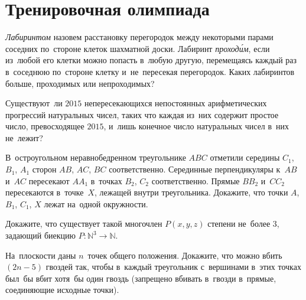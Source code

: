 
\section*{Тренировочная олимпиада}


\begin{problems}

\item
\emph{Лабиринтом} назовем расстановку перегородок между некоторыми парами
соседних по~стороне клеток шахматной доски.
Лабиринт \emph{проход\'{и}м}, если из~любой его клетки можно попасть в~любую
другую, перемещаясь каждый раз в~соседнюю по~стороне клетку и~не~пересекая
перегородок.
Каких лабиринтов больше, проходимых или непроходимых?

\item
Существуют~ли $2015$ непересекающихся непостоянных арифметических прогрессий
натуральных чисел, таких что каждая из~них содержит простое число,
превосходящее $2015$, и~лишь конечное число натуральных чисел в~них не~лежит?

\item
В~остроугольном неравнобедренном треугольнике $ABC$ отметили середины
$C_1$, $B_1$, $A_1$ сторон $AB$, $AC$, $BC$ соответственно.
Серединные перпендикуляры к~$AB$ и~$AC$ пересекают $A A_1$ в~точках
$B_2$, $C_2$ соответственно.
Прямые $B B_2$ и~$C C_2$ пересекаются в~точке~$X$, лежащей внутри треугольника.
Докажите, что точки $A$, $B_1$, $C_1$, $X$ лежат на~одной окружности.

\item
Докажите, что существует такой многочлен $P(x, y, z)$ степени не~более $3$,
задающий биекцию $P \colon \mathbb{N}^3 \to \mathbb{N}$.

\item
На~плоскости даны $n$~точек общего положения.
Докажите, что можно вбить $(2 n - 5)$ гвоздей так, чтобы в~каждый треугольник
с~вершинами в~этих точках был~бы вбит хотя~бы один гвоздь (запрещено вбивать
в~гвозди в~прямые, соединяющие исходные точки).

\end{problems}

